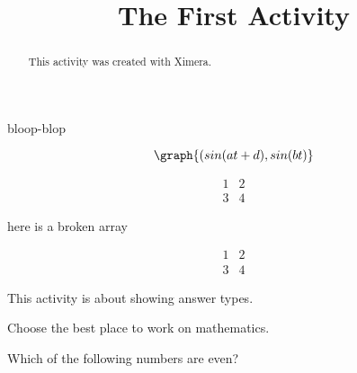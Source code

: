 \documentclass{ximera}
\title{The First Activity}
\begin{document}
  
\begin{abstract}  
This activity was created with Ximera.
\end{abstract}  
\maketitle

bloop-blop
    \begin{image}
    \end{image}

\begin{onlineOnly}
  \[
  \graph{(sin(a t + d),sin(b t)}
  \]
\end{onlineOnly}


\begin{onlineOnly}
  \begin{center}
  \end{center}
\end{onlineOnly}

\[
\begin{array}{|c|c|}
  1 & 2 \\
  3 & 4
\end{array}
\]

here is a broken array

\[
\begin{array}{|c|c|}
  1 & 2 \\
  
  3 & 4
\end{array}
\]


This activity is about showing answer types.
\begin{problem}  
  Choose the best place to work on mathematics.  
  \begin{multipleChoice}  
  \end{multipleChoice}
\end{problem}


\begin{problem}  
  Which of the following numbers are even?  
  \begin{selectAll}  
  \end{selectAll}  
\end{problem}
\end{document}
